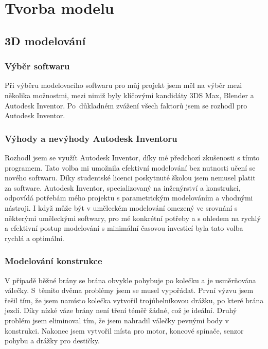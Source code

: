 \documentclass[12pt, a4paper, twoside]{report}
\begin{document}
	
	\chapter{Tvorba modelu}
	
	\section{3D modelování}
	
	\subsection{Výběr softwaru}
	
	\noindent Při výběru modelovacího softwaru pro můj projekt jsem měl na výběr mezi několika možnostmi, mezi nimiž byly klíčovými kandidáty 3DS Max, Blender a Autodesk Inventor. Po~důkladném zvážení všech faktorů jsem se rozhodl pro Autodesk Inventor. \\
	
	\subsection{Výhody a nevýhody Autodesk Inventoru}
	
	\noindent Rozhodl jsem se využít Autodesk Inventor, díky mé předchozí zkušenosti s tímto programem. Tato volba mi umožnila efektivní modelování bez nutnosti učení se nového softwaru. Díky studentské licenci poskytnuté školou jsem nemusel platit za software. Autodesk Inventor, specializovaný na inženýrství a konstrukci, odpovídá potřebám mého projektu s parametrickým modelováním a vhodnými nástroji. I když může být v uměleckém modelování omezený ve srovnání s některými uměleckými softwary, pro mé konkrétní potřeby a s ohledem na rychlý a efektivní postup modelování s minimální časovou investicí byla tato volba rychlá a optimální. \\
	
	\newpage
		
	\subsection{Modelování konstrukce}
	
	\noindent V případě běžné brány se brána obvykle pohybuje po kolečku a je usměrňována válečky. S~těmito dvěma problémy jsem se musel vypořádat. První výzvu jsem řešil tím, že jsem namísto kolečka vytvořil trojúhelníkovou drážku, po které brána jezdí. Díky nízké váze brány není tření téměř žádné, což je ideální. Druhý problém jsem eliminoval tím, že jsem nahradil válečky pevnými body v konstrukci. Nakonec jsem vytvořil místa pro motor, koncové spínače, senzor pohybu a drážky pro destičky. \\
	
\end{document}
